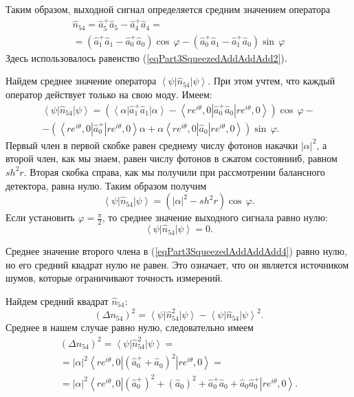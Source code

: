 Таким образом, выходной сигнал определяется средним значением оператора
\begin{eqnarray}
\hat{n}_{54} = \hat{a}_5^{+}\hat{a}_5 - 
\hat{a}_4^{+}\hat{a}_4 = 
\nonumber \\
=
\left(
\hat{a}_1^{+}\hat{a}_1 - 
\hat{a}_0^{+}\hat{a}_0
\right) \cos\,\varphi
- 
\left(
\hat{a}_0^{+}\hat{a}_1 - 
\hat{a}_1^{+}\hat{a}_0
\right) \sin\,\varphi
\end{eqnarray}
Здесь использовалось равенство (\ref{eqPart3SqueezedAddAddAdd2}).

Найдем среднее значение оператора
$\left<\psi\right|\hat{n}_{54}\left|\psi\right>$. При этом учтем, что
каждый оператор действует только на свою моду. Имеем:
\begin{eqnarray}
\left<\psi\right|\hat{n}_{54}\left|\psi\right> = 
\left(
\left<\alpha\right|\hat{a}_1^{+}\hat{a}_1\left|\alpha\right>
- 
\left<r e^{i\theta}, 0\right|\hat{a}_0^{+}\hat{a}_0\left|r
e^{i\theta}, 0\right> 
\right) \cos\,\varphi -
\nonumber \\
-
\left(
\left<r e^{i\theta}, 0\right|\hat{a}_0^{+}\left|r
e^{i\theta}, 0\right>\alpha +
\alpha 
\left<r e^{i\theta}, 0\right|\hat{a}_0\left|r
e^{i\theta}, 0\right>
\right) \sin\,\varphi.
\label{eqPart3SqueezedAddAddAdd4}
\end{eqnarray}
Первый член в первой скобке равен среднему числу фотонов накачки
$\left|\alpha\right|^2$, а второй член, как мы знаем, равен числу
фотонов в сжатом состоянииб, равном $sh^2 r$. Вторая скобка справа, как
мы получили при рассмотрении балансного детектора, равна нулю. Таким
образом получим
\begin{equation}
\left<\psi\right|\hat{n}_{54}\left|\psi\right> = 
\left(
\left|\alpha\right|^2 - sh^2 r
\right)
\cos\,\varphi.
\nonumber
\end{equation}
Если установить $\varphi=\frac{\pi}{2}$, то среднее значение выходного
сигнала равно нулю:
\[
\left<\psi\right|\hat{n}_{54}\left|\psi\right> = 0.
\]

Среднее значение второго члена в (\ref{eqPart3SqueezedAddAddAdd4})
равно нулю, но его средний квадрат нулю не равен. Это означает, что он
является источником шумов, которые ограничивают точность измерений.

Найдем средний квадрат $\hat{n}_{54}$:
\begin{equation}
\left(\Delta n_{54}\right)^2 = 
\left<\psi\right|\hat{n}_{54}^2\left|\psi\right> -
\left<\psi\right|\hat{n}_{54}\left|\psi\right>^2.
\nonumber
\end{equation}
Среднее в нашем случае равно нулю, следовательно имеем
\begin{eqnarray}
\left(\Delta n_{54}\right)^2 = 
\left<\psi\right|\hat{n}_{54}^2\left|\psi\right> =
\nonumber \\
=
\left|\alpha\right|^2
\left<r e^{i\theta}, 0\right|
\left(\hat{a}_0^{+} + \hat{a}_0\right)^2
\left|r e^{i\theta}, 0\right> =
\nonumber \\
=
\left|\alpha\right|^2
\left<r e^{i\theta}, 0\right|
\left(\hat{a}_0^{+}\right)^2 + 
\left(\hat{a}_0\right)^2 + 
\hat{a}_0^{+}\hat{a}_0 +
\hat{a}_0\hat{a}_0^{+}
\left|r e^{i\theta}, 0\right>.
\nonumber
\end{eqnarray}

